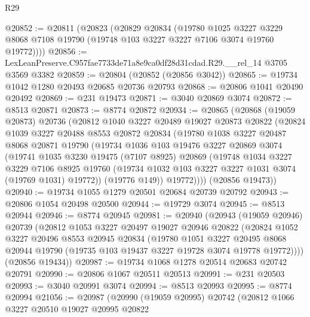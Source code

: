 \begin{lexlean}{R29}
\begin{coremodule}
@20852 := @20811
    (@20823
      (@20829
        @20834
        (@19780
          @1025
          @3227
          @3229
          @8068
          @7108
          @19790
          (@19748 @103 @3227 @3227 @7106 @3074 @19760 @19772))))
@20856 := LexLeanPreserve.C957fae7733de71a8e9ca0df28d31cdad.R29.__rel_14 @3705 @3569 @3382
@20859 := @20804 (@20852 (@20856 @3042))
@20865 := @19734 @1042 @1280 @20493 @20685 @20736 @20793
@20868 := @20806 @1041 @20490 @20492
@20869 := @231 @19473
@20871 := @3040 @20869 @3074
@20872 := @8513 @20871
@20873 := @8774 @20872
@20934 := @20865
    (@20868
      (@19059 @20873)
      @20736
      (@20812
        @1040
        @3227
        @20489
        @19027
        @20873
        @20822
        (@20824
          @1039
          @3227
          @20488
          @8553
          @20872
          @20834
          (@19780
            @1038
            @3227
            @20487
            @8068
            @20871
            @19790
            (@19734
              @1036
              @103
              @19476
              @3227
              @20869
              @3074
              (@19741
                @1035
                @3230
                @19475
                (@7107 @8925)
                @20869
                (@19748
                  @1034
                  @3227
                  @3229
                  @7106
                  @8925
                  @19760
                  (@19734 @1032 @103 @3227 @3227 @1031 @3074 (@19769 @1031) @19772))
                (@19776 @149))
              @19772))))
      (@20856 @19473))
@20940 := @19734 @1055 @1279 @20501 @20684 @20739 @20792
@20943 := @20806 @1054 @20498 @20500
@20944 := @19729 @3074
@20945 := @8513 @20944
@20946 := @8774 @20945
@20981 := @20940
    (@20943
      (@19059 @20946)
      @20739
      (@20812
        @1053
        @3227
        @20497
        @19027
        @20946
        @20822
        (@20824
          @1052
          @3227
          @20496
          @8553
          @20945
          @20834
          (@19780
            @1051
            @3227
            @20495
            @8068
            @20944
            @19790
            (@19735 @103 @19437 @3227 @19728 @3074 @19778 @19772))))
      (@20856 @19434))
@20987 := @19734 @1068 @1278 @20514 @20683 @20742 @20791
@20990 := @20806 @1067 @20511 @20513
@20991 := @231 @20503
@20993 := @3040 @20991 @3074
@20994 := @8513 @20993
@20995 := @8774 @20994
@21056 := @20987
    (@20990
      (@19059 @20995)
      @20742
      (@20812
        @1066
        @3227
        @20510
        @19027
        @20995
        @20822

\end{coremodule}
\end{lexlean}
